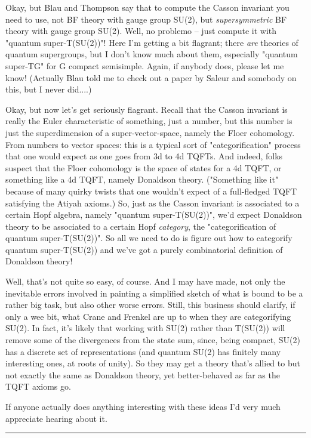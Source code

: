 Okay, but Blau and Thompson say that to compute the Casson
invariant you need to use, not BF theory with gauge group SU(2),
but \emph{supersymmetric} BF theory with gauge group SU(2).  Well,
no problemo -- just compute it with "quantum super-T(SU(2))"!  
Here I'm
getting a bit flagrant; there \emph{are} theories of quantum supergroups, 
but I don't know much about them, especially "quantum super-TG"
for G compact semisimple.  Again, if anybody does, please let me know!
(Actually Blau told me to check out a paper by Saleur and somebody
on this, but I never did....)

Okay, but now let's get seriously flagrant.  Recall that the Casson invariant
is really the Euler characteristic of something, just a number, but this
number is just the superdimension of a super-vector-space, namely
the Floer cohomology.  From numbers to vector spaces: this is a typical
sort of "categorification" process that one would expect as one goes
from 3d to 4d TQFTs.  And indeed, folks suspect that the Floer cohomology
is the space of states for a 4d TQFT, or something like a 4d TQFT,
namely Donaldson theory.  ("Something like it" because of many quirky
twists that one wouldn't expect of a full-fledged TQFT satisfying the
Atiyah axioms.)  So, just as the Casson invariant is associated to a certain
Hopf algebra, namely "quantum super-T(SU(2))", we'd expect Donaldson
theory to be associated to a certain Hopf \emph{category}, 
the "categorification
of quantum super-T(SU(2))".  So all we need to do is figure out how
to categorify quantum super-T(SU(2)) and we've got a purely combinatorial
definition of Donaldson theory!

Well, that's not quite so easy, of course.  And I may have made, not
only the inevitable errors involved in painting a simplified sketch of what is
bound to be a rather big task, but also other worse errors.  Still, 
this business should clarify, if only a wee bit, what Crane and Frenkel are up 
to when they are categorifying SU(2).  In fact, it's likely that working with 
SU(2) rather than T(SU(2)) will remove some of the divergences from the state 
sum, since, being compact, SU(2) has a discrete set of representations (and
quantum SU(2) has finitely many interesting ones, at roots of unity).  So
they may get a theory that's allied to but not exactly the same as Donaldson 
theory, yet better-behaved as far as the TQFT axioms go.  

If anyone actually does anything interesting with these ideas I'd
very much appreciate hearing about it.

\par\noindent\rule{\textwidth}{0.4pt}
